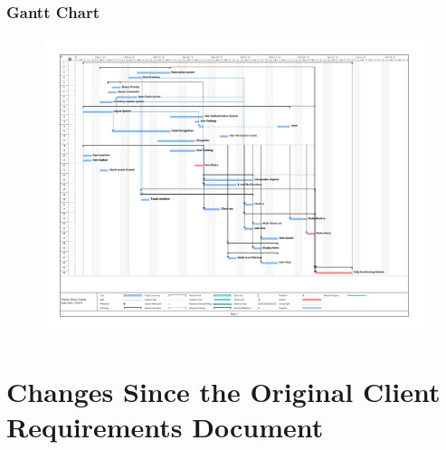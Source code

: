 \documentclass[10pt, onecolumn, twoside, peerreview]{IEEEtran}
\begin{document}
\subsubsection{Gantt Chart}
\begin{figure}[H]
	\includegraphics[angle=90, width=\textwidth]{gantt}
\end{figure}
\clearpage

\section{Changes Since the Original Client Requirements Document}
\end{document}
